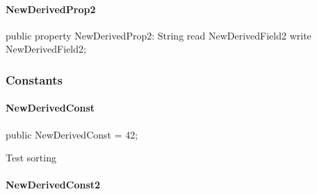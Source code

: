 \documentclass{report}
\begin{document}
\paragraph*{NewDerivedProp2}\hspace*{\fill}

\begin{list}{}{
\setlength{\itemindent}{0cm}
\setlength{\listparindent}{0cm}
\setlength{\leftmargin}{\evensidemargin}
\addtolength{\leftmargin}{\tmplength}
\settowidth{\labelsep}{X}
\addtolength{\leftmargin}{\labelsep}
\setlength{\labelwidth}{\tmplength}
}
\begin{flushleft}
\item[\textbf{Declaration}\hfill]
\begin{ttfamily}
public property NewDerivedProp2: String read NewDerivedField2 write NewDerivedField2;\end{ttfamily}


\end{flushleft}
\end{list}
\subsubsection*{\large{\textbf{Constants}}\normalsize\hspace{1ex}\hfill}
\paragraph*{NewDerivedConst}\hspace*{\fill}

\begin{list}{}{
\setlength{\itemindent}{0cm}
\setlength{\listparindent}{0cm}
\setlength{\leftmargin}{\evensidemargin}
\addtolength{\leftmargin}{\tmplength}
\settowidth{\labelsep}{X}
\addtolength{\leftmargin}{\labelsep}
\setlength{\labelwidth}{\tmplength}
}
\begin{flushleft}
\item[\textbf{Declaration}\hfill]
\begin{ttfamily}
public NewDerivedConst = 42;\end{ttfamily}


\end{flushleft}
\par
\item[\textbf{Description}]
Test sorting

\end{list}
\paragraph*{NewDerivedConst2}\hspace*{\fill}
\end{document}
